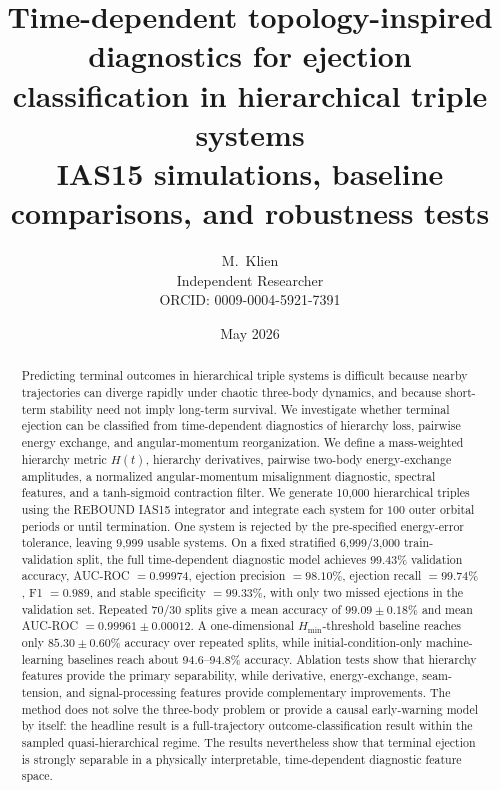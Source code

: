 \documentclass[12pt,a4paper]{article}
\title{%
  \textbf{Time-dependent topology-inspired diagnostics for ejection classification in hierarchical triple systems}\\[6pt]
  \large IAS15 simulations, baseline comparisons, and robustness tests
}
\author{%
  M.~Klien\\
  \small Independent Researcher\\
  \small ORCID: 0009-0004-5921-7391
}
\date{May 2026}
\newcommand{\Hmin}{H_{\min}}
\begin{document}

\maketitle

\begin{abstract}
Predicting terminal outcomes in hierarchical triple systems is difficult because nearby trajectories can diverge rapidly under chaotic three-body dynamics, and because short-term stability need not imply long-term survival. We investigate whether terminal ejection can be classified from time-dependent diagnostics of hierarchy loss, pairwise energy exchange, and angular-momentum reorganization. We define a mass-weighted hierarchy metric \(H(t)\), hierarchy derivatives, pairwise two-body energy-exchange amplitudes, a normalized angular-momentum misalignment diagnostic, spectral features, and a tanh-sigmoid contraction filter. We generate 10,000 hierarchical triples using the REBOUND IAS15 integrator and integrate each system for \(100\) outer orbital periods or until termination. One system is rejected by the pre-specified energy-error tolerance, leaving 9,999 usable systems. On a fixed stratified 6,999/3,000 train-validation split, the full time-dependent diagnostic model achieves 99.43\% validation accuracy, AUC-ROC \(=0.99974\), ejection precision \(=98.10\%\), ejection recall \(=99.74\%\), F1 \(=0.989\), and stable specificity \(=99.33\%\), with only two missed ejections in the validation set. Repeated 70/30 splits give a mean accuracy of \(99.09\pm0.18\%\) and mean AUC-ROC \(=0.99961\pm0.00012\). A one-dimensional \(\Hmin\)-threshold baseline reaches only \(85.30\pm0.60\%\) accuracy over repeated splits, while initial-condition-only machine-learning baselines reach about 94.6--94.8\% accuracy. Ablation tests show that hierarchy features provide the primary separability, while derivative, energy-exchange, seam-tension, and signal-processing features provide complementary improvements. The method does not solve the three-body problem or provide a causal early-warning model by itself: the headline result is a full-trajectory outcome-classification result within the sampled quasi-hierarchical regime. The results nevertheless show that terminal ejection is strongly separable in a physically interpretable, time-dependent diagnostic feature space.
\end{abstract}

\tableofcontents
\newpage
\end{document}
